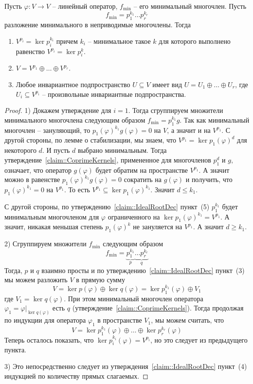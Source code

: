 \begin{claim}
\label{claim::GenRootDec}
Пусть $\varphi\colon V\to V$ -- линейный оператор, $f_\text{min}$ -- его минимальный многочлен.
Пусть
\[
f_\text{min} = p_1^{k_1} \ldots p_r^{k_r}
\]
разложение минимального в неприводимые многочлены.
Тогда
\begin{enumerate}
\item  $V^{p_i} = \ker p_i^{k_i}$ причем $k_i$ -- минимальное такое $k$ для которого выполнено равенство $V^{p_i} = \ker p_i^{k}$.

\item $V = V^{p_1}\oplus \ldots \oplus V^{p_r}$.

\item Любое инвариантное подпространство $U\subseteq V$ имеет вид $U = U_1\oplus \ldots \oplus U_r$, где $U_i \subseteq V^{p_i}$ -- произвольные инвариантные подпространства.
\end{enumerate}
\end{claim}
\begin{proof}
1) Докажем утверждение для $i = 1$.
Тогда сгруппируем множители минимального многочлена следующим образом $f_\text{min} = p_1^{k_1} g$.
Так как минимальный многочлен -- зануляющий, то $p_1(\varphi)^{k_1}g(\varphi) = 0$ на $V$, а значит и на $V^{p_1}$.
С другой стороны, по лемме о стабилизации, мы знаем, что $V^{p_1} = \ker p_1(\varphi)^{d}$ для некоторого $d$.
И пусть $d$ выбрано минимальным.
Тогда утверждение~\ref{claim::CoprimeKernels}, примененное для многочленов $p_1^d$ и $g$, означает, что оператор $g(\varphi)$ будет обратим на пространстве $V^{p_1}$.
А значит можно в равенстве $p_1(\varphi)^{k_1}g(\varphi) = 0$  сократить на $g(\varphi)$ и получить, что $p_1(\varphi)^{k_1} = 0$ на $V^{p_1}$.
То есть $V^{p_1}\subseteq \ker p_1(\varphi)^{k_1}$.
Значит $d \leqslant k_1$.

С другой стороны, по утверждению~\ref{claim::IdealRootDec} пункт~(5) $p_1^{k_1}$ будет минимальным многочленом для $\varphi$ ограниченного на $\ker p_1(\varphi)^{k_1} = V^{p_1}$.
А значит, никакая меньшая степень $p_1(\varphi)^k$ не зануляется на $V^{p_1}$.
А значит $d \geqslant k_1$.

2) Сгруппируем множители $f_\text{min}$ следующим образом
\[
f_\text{min} = \underbrace{p_1^{k_1}}_{p}\underbrace{\ldots p_r^{k_r}}_{q}
\]
Тогда, $p$ и $q$ взаимно просты и по утверждению~\ref{claim::IdealRootDec} пункт~(3) мы можем разложить $V$ в прямую сумму 
\[
V = \ker p(\varphi) \oplus \ker q(\varphi) = \ker p_1^{k_1}(\varphi) \oplus V_1
\]
где $V_1 = \ker q(\varphi)$.
При этом минимальный многочлен оператора $\varphi_1 = \varphi|_{\ker q(\varphi)}$ есть $q$ (утверждение~\ref{claim::CoprimeKernels}).
Тогда продолжая по индукции для оператора $\varphi_1$ в пространстве $V_1$, мы можем считать, что
\[
V = \ker p_1^{k_1}(\varphi)\oplus \ldots \oplus \ker p_r^{k_r}(\varphi)
\]
Теперь осталось показать, что $\ker p_i^{k_i}(\varphi) =  V^{p_i}$, но это следует из предыдущего пункта.

3) Это непосредственно следует из утверждения~\ref{claim::IdealRootDec} пункт~(4) индукцией по количеству прямых слагаемых.
\end{proof}




